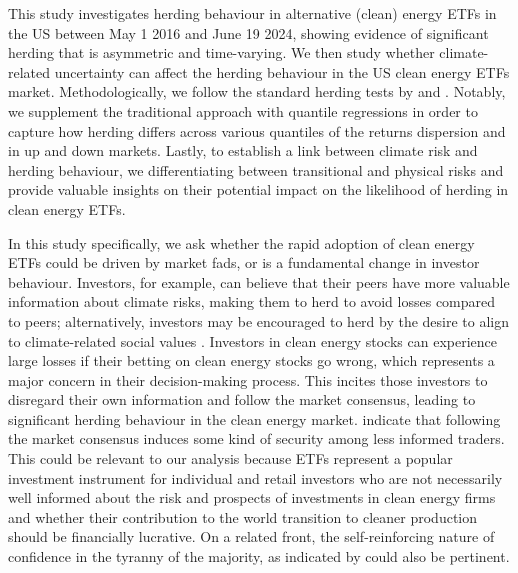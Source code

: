 \documentclass[
  letterpaper,
  DIV=11,
  numbers=noendperiod]{scrartcl}
\begin{document}
This study investigates herding behaviour in alternative (clean) energy
ETFs in the US between May 1 2016 and June 19 2024, showing evidence of
significant herding that is asymmetric and time-varying. We then study
whether climate-related uncertainty can affect the herding behaviour in
the US clean energy ETFs market. Methodologically, we follow the
standard herding tests by \citet{christie1995} and \citet{chang2000}.
Notably, we supplement the traditional approach with quantile
regressions \citep{koenker1978} in order to capture how herding differs
across various quantiles of the returns dispersion and in up and down
markets. Lastly, to establish a link between climate risk and herding
behaviour, we differentiating between transitional and physical risks
\citep{bua2024} and provide valuable insights on their potential impact
on the likelihood of herding in clean energy ETFs.

In this study specifically, we ask whether the rapid adoption of clean
energy ETFs could be driven by market fads, or is a fundamental change
in investor behaviour. Investors, for example, can believe that their
peers have more valuable information about climate risks, making them to
herd to avoid losses compared to peers; alternatively, investors may be
encouraged to herd by the desire to align to climate-related social
values \citep{ciciretti2021, gavrilakis2023, loang2023}. Investors in
clean energy stocks can experience large losses if their betting on
clean energy stocks go wrong, which represents a major concern in their
decision-making process. This incites those investors to disregard their
own information and follow the market consensus, leading to significant
herding behaviour in the clean energy market. \citet{devenow1996}
indicate that following the market consensus induces some kind of
security among less informed traders. This could be relevant to our
analysis because ETFs represent a popular investment instrument for
individual and retail investors who are not necessarily well informed
about the risk and prospects of investments in clean energy firms and
whether their contribution to the world transition to cleaner production
should be financially lucrative. On a related front, the
self-reinforcing nature of confidence in the tyranny of the majority, as
indicated by \citet{teraji2003} could also be pertinent.
\end{document}
